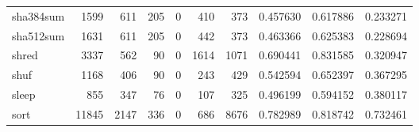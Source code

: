 \begin{tabular}{lrrrrrrrrr}
sha384sum &                                1599 &                                             611 &                                            205 &                                             0 &                                            410 &                                          373 &                                           0.457630 &                               0.617886 &                             0.233271 \\
sha512sum &                                1631 &                                             611 &                                            205 &                                             0 &                                            442 &                                          373 &                                           0.463366 &                               0.625383 &                             0.228694 \\
shred     &                                3337 &                                             562 &                                             90 &                                             0 &                                           1614 &                                         1071 &                                           0.690441 &                               0.831585 &                             0.320947 \\
shuf      &                                1168 &                                             406 &                                             90 &                                             0 &                                            243 &                                          429 &                                           0.542594 &                               0.652397 &                             0.367295 \\
sleep     &                                 855 &                                             347 &                                             76 &                                             0 &                                            107 &                                          325 &                                           0.496199 &                               0.594152 &                             0.380117 \\
sort      &                               11845 &                                            2147 &                                            336 &                                             0 &                                            686 &                                         8676 &                                           0.782989 &                               0.818742 &                             0.732461 \\

\end{tabular}
